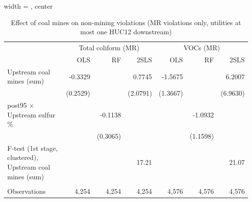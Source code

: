 
\begin{table}[htbp]
   
   \caption{\label{2sls_dwnstrm_nonminevio_mr_ivsum} Effect of coal mines on non-mining violations (MR violations only, utilities at most one HUC12 downstream)}
   \bigskip
   
   \centering
   
   \begin{adjustbox}{width = \textwidth, center}
      
      
      \begin{tabular}{lrrrrrr}
         \toprule
         
          & \multicolumn{3}{c}{Total coliform (MR)} & \multicolumn{3}{c}{VOCs (MR)}\\
         
                                                                  & OLS      & RF       & 2SLS     & OLS      & RF       & 2SLS\\  
         
         \midrule 
         Upstream coal mines (sum)                                & -0.3329  &          & 0.7745   & -1.5675  &          & 6.2007\\   
                                                                  & (0.2529) &          & (2.0791) & (1.3667) &          & (6.9630)\\   
         post95 $\times$ Upstream sulfur \%                       &          & -0.1138  &          &          & -1.0932  &   \\   
                                                                  &          & (0.3065) &          &          & (1.1598) &   \\   
         
         F-test (1st stage, clustered), Upstream coal mines (sum) &          &          & 17.21    &          &          & 21.07\\  
         
          \\
         
         Observations                                             & 4,254    & 4,254    & 4,254    & 4,576    & 4,576    & 4,576\\  
         
         \bottomrule
         
      \end{tabular}
      

\end{adjustbox}
\end{table}

